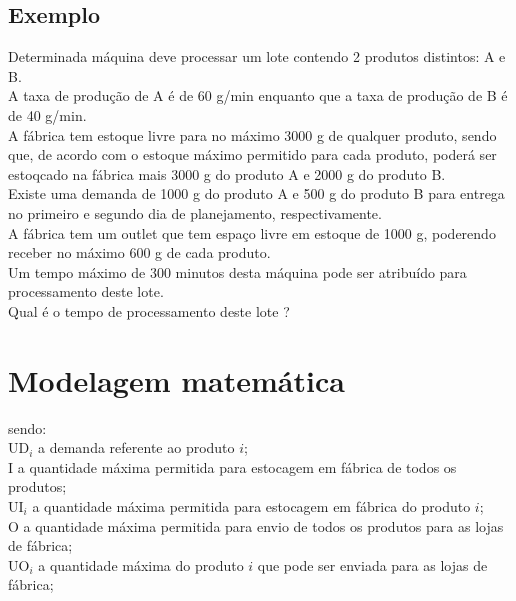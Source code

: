 \documentclass{book}
\begin{document}
\subsection{Exemplo}

Determinada máquina deve processar um lote contendo 2 produtos distintos: A e B. \\

A taxa de produção de A é de 60 g/min enquanto que a taxa de produção de B é de 40 g/min. \\

A fábrica tem estoque livre para no máximo 3000 g de qualquer produto, sendo que, de acordo com o estoque máximo permitido para cada produto, poderá ser estoqcado na fábrica mais 3000 g do produto A e 2000 g do produto B. \\

Existe uma demanda de 1000 g do produto A e 500 g do produto B para entrega no primeiro e segundo dia de planejamento, respectivamente. \\

A fábrica tem um outlet que tem espaço livre em estoque de 1000 g, poderendo receber no máximo 600 g de cada produto. \\

Um tempo máximo de 300 minutos desta máquina pode ser atribuído para processamento deste lote. \\

Qual é o tempo de processamento deste lote ? \\

\section{Modelagem matemática}

sendo: \\

$\textrm{UD}_i$ a demanda referente ao produto $i$; \\

$\textrm{I}$ a quantidade máxima permitida para estocagem em fábrica de todos os produtos; \\

$\textrm{UI}_i$ a quantidade máxima permitida para estocagem em fábrica do produto $i$; \\

$\textrm{O}$ a quantidade máxima permitida para envio de todos os produtos para as lojas de fábrica; \\

$\textrm{UO}_i$ a quantidade máxima do produto $i$ que pode ser enviada para as lojas de fábrica; \\ 
\end{document}
